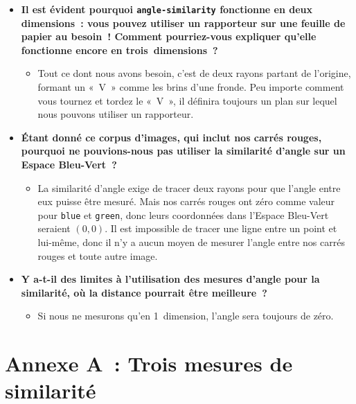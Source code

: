 \documentclass[12pt,a4paper]{article}
\begin{document}
\begin{thinkbox}
  \begin{itemize}
    \item \textbf{Il est évident pourquoi \texttt{angle-similarity} fonctionne en deux dimensions~: vous pouvez utiliser un rapporteur sur une feuille de papier au besoin~! Comment pourriez-vous expliquer qu'elle fonctionne encore en \textbf{trois}~dimensions~?}
    \begin{itemize}
      \item Tout ce dont nous avons besoin, c'est de deux rayons partant de l'origine, formant un «~V~» comme les brins d'une fronde. Peu importe comment vous tournez et tordez le «~V~», il définira toujours un plan sur lequel nous pouvons utiliser un rapporteur.
    \end{itemize}
    \item \textbf{Étant donné ce corpus d'images, qui inclut nos carrés rouges, pourquoi ne pouvions-nous pas utiliser la similarité d'angle sur un Espace Bleu-Vert~?}
    \begin{itemize}
      \item La similarité d'angle exige de tracer deux rayons pour que l'angle entre eux puisse être mesuré. Mais nos carrés rouges ont zéro comme valeur pour \texttt{blue} et \texttt{green}, donc leurs coordonnées dans l'Espace Bleu-Vert seraient $(0, 0)$. Il est impossible de tracer une ligne entre un point et lui-même, donc il n'y a aucun moyen de mesurer l'angle entre nos carrés rouges et toute autre image.
    \end{itemize}
    \item \textbf{Y a-t-il des limites à l'utilisation des mesures d'angle pour la similarité, où la distance pourrait être meilleure~?}
    \begin{itemize}
      \item Si nous ne mesurons qu'en 1~dimension, l'angle sera toujours de zéro.
    \end{itemize}
  \end{itemize}
\end{thinkbox}

\newpage

\section*{Annexe A~: Trois mesures de similarité}
\end{document}
